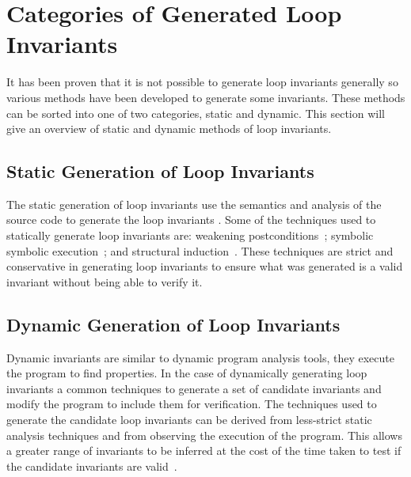 \section{Categories of Generated Loop Invariants}

It has been proven that it is not possible to generate loop invariants
generally 
so various methods have been developed to generate some invariants.
These methods can be sorted into one of two categories, static and dynamic.
This section will give an overview of static and dynamic methods of loop
invariants.

\subsection{Static Generation of Loop Invariants}

The static generation of loop invariants use the
semantics and analysis of the source code to generate the loop invariants
\cite{java-static-symb}.
Some of the techniques used to statically generate loop invariants are:
weakening postconditions~\cite{infer-postconditions};  symbolic symbolic
execution~\cite{java-static-symb}; and structural
induction~\cite{struct-induction}.
These techniques are strict and conservative in generating loop invariants
to ensure what was generated is a valid invariant without being able to
verify it.



\subsection{Dynamic Generation of Loop Invariants}

Dynamic invariants are similar to dynamic program analysis
tools, they execute the program to find properties.
In the case of dynamically generating loop invariants a
common techniques to generate a set of candidate invariants
and modify the program to include them for verification.
The techniques used to generate the candidate loop invariants
can be derived from less-strict static analysis techniques and
from observing the execution of the program.
This allows a greater range of invariants to be inferred at
the cost of the time taken to test if the candidate invariants are
valid~\cite{infer-dynamic}\cite{infer-postconditions}.



